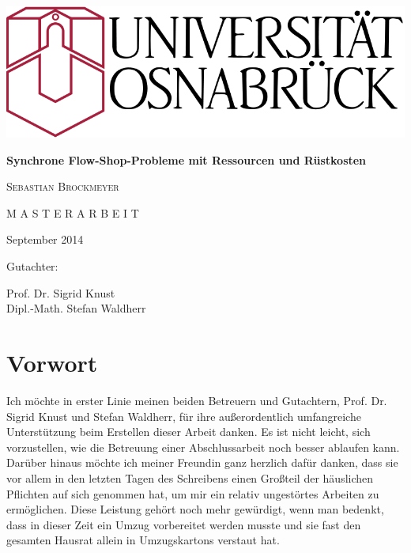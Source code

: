 \documentclass{scrreprt}
\begin{document}
\thispagestyle{empty}

\begin{center}


    \vspace{3cm}

    \includegraphics[width=.8\textwidth]{uos.png}

    \vspace{1cm}

    {\huge\textbf{Synchrone Flow-Shop-Probleme mit Ressourcen und Rüstkosten}}

    \vspace{2ex}

    \vspace{1cm}



    \vspace{2ex}

    {\Large\textsc{Sebastian Brockmeyer}}

    \vspace{3cm}

    {\Large\textsc{M A S T E R A R B E I T}}

    \vspace{2cm}

    {\Large{September 2014}}

    \vspace{1cm}

    {Gutachter:}

    \vspace{2ex}

    {\Large{Prof. Dr. Sigrid Knust \\ Dipl.-Math. Stefan Waldherr}}

\end{center}

\chapter*{Vorwort}
Ich möchte in erster Linie meinen beiden Betreuern und Gutachtern, Prof. Dr. Sigrid Knust und Stefan Waldherr,
für ihre außerordentlich umfangreiche Unterstützung beim Erstellen dieser Arbeit danken.
Es ist nicht leicht, sich vorzustellen, wie die Betreuung einer Abschlussarbeit noch besser ablaufen kann.
Darüber hinaus möchte ich meiner Freundin ganz herzlich dafür danken,
dass sie vor allem in den letzten Tagen des Schreibens einen Großteil der häuslichen Pflichten auf sich genommen hat,
um mir ein relativ ungestörtes Arbeiten zu ermöglichen.
Diese Leistung gehört noch mehr gewürdigt, wenn man bedenkt, dass in dieser Zeit ein Umzug vorbereitet werden musste
und sie fast den gesamten Hausrat allein in Umzugskartons verstaut hat.
\end{document}
